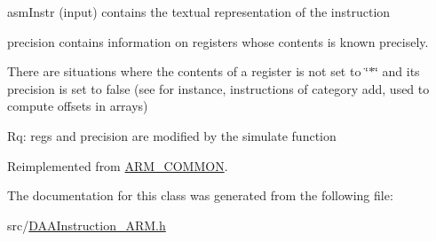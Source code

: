 asm\+Instr (input) contains the textual representation of the instruction

precision contains information on registers whose contents is known precisely.

There are situations where the contents of a register is not set to \char`\"{}$\ast$\char`\"{} and its precision is set to false (see for instance, instructions of category add, used to compute offsets in arrays)

Rq\+: regs and precision are modified by the simulate function 

Reimplemented from \hyperlink{classARM__COMMON_a89eb552311ce787557a976aee2fa2db6}{A\+R\+M\+\_\+\+C\+O\+M\+M\+ON}.



The documentation for this class was generated from the following file\+:\begin{DoxyCompactItemize}
\item 
src/\hyperlink{DAAInstruction__ARM_8h}{D\+A\+A\+Instruction\+\_\+\+A\+R\+M.\+h}\end{DoxyCompactItemize}
